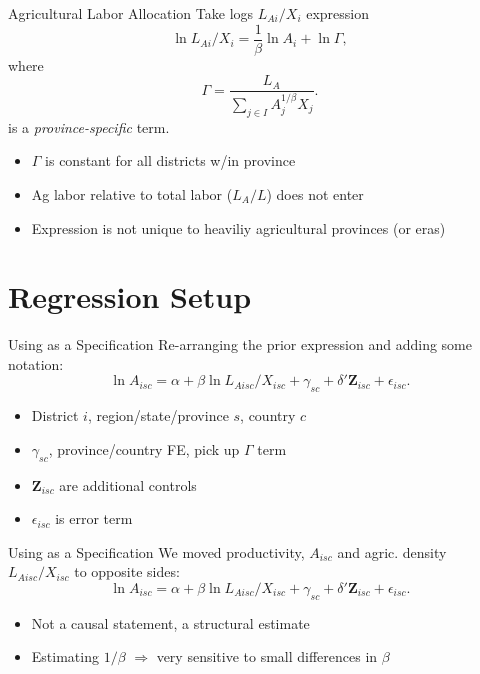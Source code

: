 \documentclass[10pt, xcolor=dvipsnames]{beamer}
\begin{document}
\begin{frame}{Agricultural Labor Allocation}\label{model}
Take logs $L_{Ai}/X_i$ expression
\begin{equation}
\ln L_{Ai}/X_i = \frac{1}{\beta} \ln A_{i} + \ln \Gamma, \label{EQ_est}
\end{equation}
where
\begin{equation}
    \Gamma = \frac{L_A}{\sum_{j\in I} A_{j}^{1/\beta}X_{j}}.
\end{equation}
is a \textit{province-specific} term. 

\begin{itemize}
  \item $\Gamma$ is constant for all districts w/in province
  \item Ag labor relative to total labor ($L_A/L$) does not enter
  \item Expression is not unique to heaviliy agricultural provinces (or eras)
\end{itemize}

\hfill \hyperlink{extend}{}
\end{frame}

\section{Regression Setup}

\begin{frame}{Using as a Specification}
Re-arranging the prior expression and adding some notation:
\begin{equation}
  \ln A_{isc} = \alpha + \beta \ln L_{Aisc}/X_{isc} + \gamma_{sc} + \delta' \mathbf{Z}_{isc} + \epsilon_{isc}. \label{EQ_regress}
\end{equation}

\begin{itemize}
  \item District $i$, region/state/province $s$, country $c$
  \item $\gamma_{sc}$, province/country FE, pick up $\Gamma$ term
  \item $\mathbf{Z}_{isc}$ are additional controls
  \item $\epsilon_{isc}$ is error term
\end{itemize}
\end{frame}

\begin{frame}{Using as a Specification}
We moved productivity, $A_{isc}$ and agric. density $L_{Aisc}/X_{isc}$ to opposite sides:
\begin{equation}
  \ln A_{isc} = \alpha + \beta \ln L_{Aisc}/X_{isc} + \gamma_{sc} + \delta' \mathbf{Z}_{isc} + \epsilon_{isc}. \label{EQ_regress}
\end{equation}

\begin{itemize}
  \item Not a causal statement, a structural estimate
  \item Estimating $1/\beta$ $\Rightarrow$ very sensitive to small differences in $\beta$
\end{itemize}
\end{frame}
\end{document}
